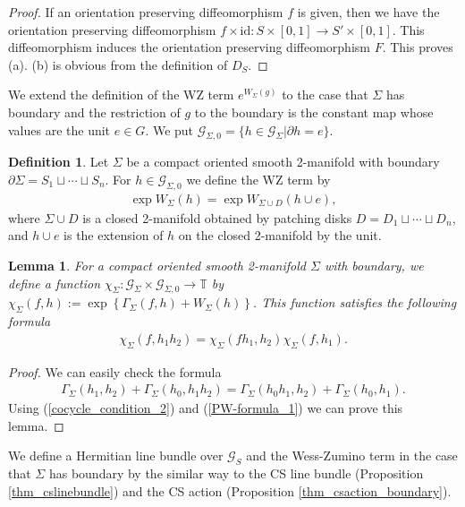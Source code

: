 \documentclass[a4paper,a4paper]{article}
\newtheorem{lem}[thm]{Lemma}
\theoremstyle{definition}
\newtheorem{dfn}[thm]{Definition}
\theoremstyle{remark}
\newcommand{\T}{\mathbb{T}}
\newcommand{\G}{\mathcal{G}}
\begin{document}
\begin{proof}
If an orientation preserving diffeomorphism $f$ is given, then we have the orientation preserving diffeomorphism $f \times \mathrm{id} : S \times [0,1] \to S' \times [0,1]$. This diffeomorphism induces the orientation preserving diffeomorphism $F$. This proves (a). (b) is obvious from the definition of $D_S$.
\end{proof}

We extend the definition of the WZ term $e^{W_\Sigma(g)}$ to the case that $\Sigma$ has boundary and the restriction of $g$ to the boundary is the constant map whose values are the unit $e \in G$. We put $\G_{\Sigma,0} = \{ h \in \G_\Sigma | \partial h = e \}$.

\begin{dfn} \label{dfn_WZ_boundary_unit}
Let $\Sigma$ be a compact oriented smooth 2-manifold with boundary $\partial \Sigma = S_1 \sqcup \cdots \sqcup S_n$. For $h \in \G_{\Sigma,0}$ we define the WZ term by
\begin{eqnarray}
\exp W_\Sigma(h) = \exp W_{\Sigma \cup D} (h \cup e) ,
\end{eqnarray}
where $\Sigma \cup D$ is a closed 2-manifold obtained by patching disks $D = D_1 \sqcup \cdots \sqcup D_n$, and $h \cup e$ is the extension of $h$ on the closed 2-manifold by the unit.
\end{dfn}

\begin{lem}
For a compact oriented smooth 2-manifold $\Sigma$ with boundary, we define a function $\chi_\Sigma : \G_\Sigma \times \G_{\Sigma,0} \to \T$ by $\chi_\Sigma(f, h) := \exp \left\{ \Gamma_\Sigma (f, h) + W_\Sigma(h) \right\}$. This function satisfies the following formula
\begin{eqnarray}
\chi_\Sigma(f, h_1 h_2) = \chi_\Sigma(f h_1, h_2) \chi_\Sigma(f, h_1).
\end{eqnarray}
\end{lem}

\begin{proof}
We can easily check the formula
\begin{eqnarray}
\Gamma_\Sigma(h_1, h_2) + \Gamma_\Sigma(h_0, h_1 h_2) 
= \Gamma_\Sigma(h_0 h_1, h_2) + \Gamma_\Sigma(h_0, h_1) .
\label{cocycle_condition_2}
\end{eqnarray}
Using (\ref{cocycle_condition_2}) and (\ref{PW-formula_1}) we can prove this lemma.
\end{proof}

We define a Hermitian line bundle over $\G_S$ and the Wess-Zumino term in the case that $\Sigma$ has boundary by the similar way to the CS line bundle (Proposition \ref{thm_cslinebundle}) and the CS action (Proposition \ref{thm_csaction_boundary}).
\end{document}
